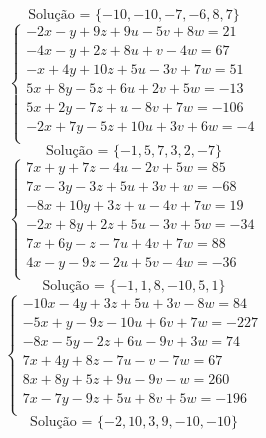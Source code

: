 \documentclass[12pt,oneside,a4paper]{article}
\begin{document}
\begin{equation*}
\text{Solução = }\{-10,-10,-7,-6,8,7\}
\end{equation*}
\vspace{\baselineskip}
\begin{equation*}
\begin{cases}
-2x-y+9z+9u-5v+8w=21 \\
-4x-y+2z+8u+v-4w=67 \\
-x+4y+10z+5u-3v+7w=51 \\
5x+8y-5z+6u+2v+5w=-13 \\
5x+2y-7z+u-8v+7w=-106 \\
-2x+7y-5z+10u+3v+6w=-4 \\
\end{cases}
\end{equation*}
\begin{equation*}
\text{Solução = }\{-1,5,7,3,2,-7\}
\end{equation*}
\vspace{\baselineskip}
\begin{equation*}
\begin{cases}
7x+y+7z-4u-2v+5w=85 \\
7x-3y-3z+5u+3v+w=-68 \\
-8x+10y+3z+u-4v+7w=19 \\
-2x+8y+2z+5u-3v+5w=-34 \\
7x+6y-z-7u+4v+7w=88 \\
4x-y-9z-2u+5v-4w=-36 \\
\end{cases}
\end{equation*}
\begin{equation*}
\text{Solução = }\{-1,1,8,-10,5,1\}
\end{equation*}
\vspace{\baselineskip}
\begin{equation*}
\begin{cases}
-10x-4y+3z+5u+3v-8w=84 \\
-5x+y-9z-10u+6v+7w=-227 \\
-8x-5y-2z+6u-9v+3w=74 \\
7x+4y+8z-7u-v-7w=67 \\
8x+8y+5z+9u-9v-w=260 \\
7x-7y-9z+5u+8v+5w=-196 \\
\end{cases}
\end{equation*}
\begin{equation*}
\text{Solução = }\{-2,10,3,9,-10,-10\}
\end{equation*}
\end{document}

